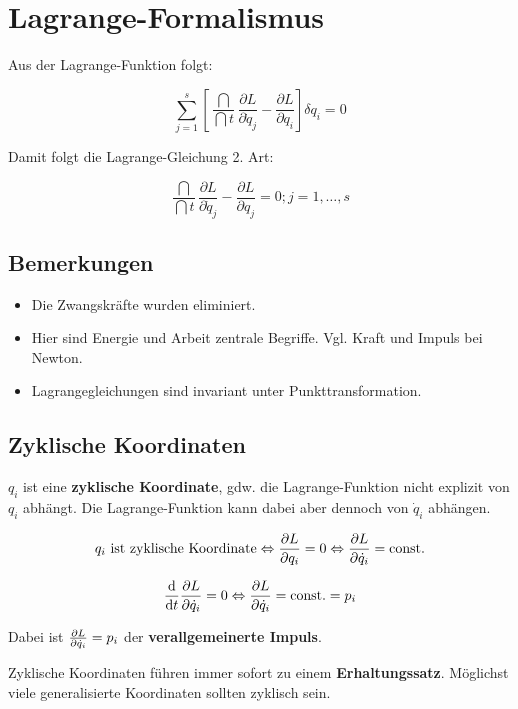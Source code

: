 \chapter{Lagrange-Formalismus}
Aus der Lagrange-Funktion folgt:

\[ \sum_{j=1}^s [ \dfrac{\dint}{\dint t} \dfrac{\partial L}{\partial \dot q_j} - \dfrac{\partial L}{\partial q_i} ] \delta q_i = 0 \]

Damit folgt die Lagrange-Gleichung 2. Art:

\[ \dfrac{\dint}{\dint t} \dfrac{\partial L}{\partial \dot q_j} - \dfrac{\partial L}{\partial q_j} = 0; j = 1, \ldots, s\]


\section{Bemerkungen}
\begin{itemize}
    \item Die Zwangskräfte wurden eliminiert.
    \item Hier sind Energie und Arbeit zentrale Begriffe. Vgl. Kraft und Impuls bei Newton.
    \item Lagrangegleichungen sind invariant unter Punkttransformation.
\end{itemize}


\section{Zyklische Koordinaten}
$q_i$ ist eine {\bf zyklische Koordinate}, gdw. die Lagrange-Funktion nicht explizit von $q_i$ abhängt. Die Lagrange-Funktion kann dabei aber dennoch von $\dot q_i$ abhängen.

\[ q_i \text{ ist zyklische Koordinate} \Leftrightarrow \pdv{L}{q_i} = 0 \Leftrightarrow \pdv{L}{\dot q_i} = \text{const.} \]

\[ \dv{}{t} \pdv{L}{\dot q_i} = 0 \Leftrightarrow \pdv{L}{\dot q_i} = \text{const.} = p_i \]

Dabei ist $\pdv{L}{\dot q_i} = p_i$ der {\bf verallgemeinerte Impuls}.

Zyklische Koordinaten führen immer sofort zu einem {\bf Erhaltungssatz}. Möglichst viele generalisierte Koordinaten sollten zyklisch sein.